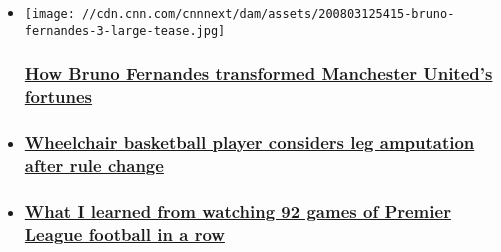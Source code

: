 \begin{itemize}
\item
  \href{/2020/08/04/football/manchester-united-bruno-fernandes-europa-league-cmd-spt-intl/index.html}{}

  \texttt{[image: //cdn.cnn.com/cnnnext/dam/assets/200803125415-bruno-fernandes-3-large-tease.jpg]}

  \hypertarget{how-bruno-fernandes-transformed-manchester-uniteds-fortunes}{%
  \subsubsection{\texorpdfstring{\href{/2020/08/04/football/manchester-united-bruno-fernandes-europa-league-cmd-spt-intl/index.html}{How
  Bruno Fernandes transformed Manchester United's
  fortunes}}{How Bruno Fernandes transformed Manchester United's fortunes}}\label{how-bruno-fernandes-transformed-manchester-uniteds-fortunes}}
\item
  \hypertarget{wheelchair-basketball-player-considers-leg-amputation-after-rule-change}{%
  \subsubsection{\texorpdfstring{\href{/2020/07/30/sport/wheelchair-paralympics-amputation-compete-scli-spt-intl-gbr/index.html}{Wheelchair
  basketball player considers leg amputation after rule
  change}}{Wheelchair basketball player considers leg amputation after rule change}}\label{wheelchair-basketball-player-considers-leg-amputation-after-rule-change}}
\item
  \hypertarget{what-i-learned-from-watching-92-games-of-premier-league-football-in-a-row}{%
  \subsubsection{\texorpdfstring{\href{/2020/07/28/football/premier-league-restart-glen-levy-binge-cmd-spt-intl/index.html}{What
  I learned from watching 92 games of Premier League football in a
  row}}{What I learned from watching 92 games of Premier League football in a row}}\label{what-i-learned-from-watching-92-games-of-premier-league-football-in-a-row}}
\end{itemize}

